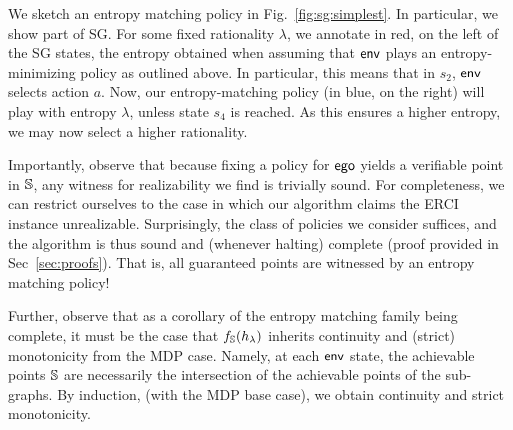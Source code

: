 \begin{example}
We sketch an entropy matching policy in Fig.~\ref{fig:sg:simplest}. In particular, we show part of SG. For some fixed rationality $\lambda$, we annotate in red, on the left of the SG states, the entropy obtained when assuming that $\mathsf{env}$ plays an entropy-minimizing policy as outlined above. In particular, this means that in $s_2$, $\mathsf{env}$ selects action $a$. Now, our entropy-matching policy (in blue, on the right) will play with entropy $\lambda$, unless state $s_4$ is reached. As this ensures a higher entropy, we may now select a higher rationality.
\end{example}

%

Importantly, observe that because
fixing a policy for $\mathsf{ego}$ yields a verifiable point in $\mathbb{S}$, any witness
for realizability we find is trivially sound. For completeness, we can
restrict ourselves to the case in which our algorithm claims the ERCI
instance unrealizable. Surprisingly, the class of policies we consider
suffices, and the algorithm is thus sound and (whenever halting)
complete (proof provided in Sec~\ref{sec:proofs}). That is, all
guaranteed points are witnessed by an entropy matching policy!

Further, observe that as a corollary of the entropy matching family
being complete, it must be the case that $f_\mathbb{S}(h_\lambda)$
inherits continuity and (strict) monotonicity from the MDP
case. Namely, at each $\mathsf{env}$ state, the achievable points
$\mathbb{S}$ are necessarily the intersection of the achievable points
of the sub-graphs. By induction, (with the MDP base case), we obtain
continuity and strict monotonicity.


